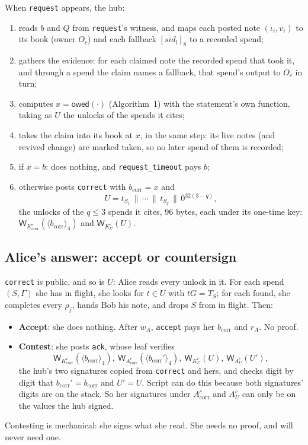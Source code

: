 \documentclass[11pt]{article}
\theoremstyle{plain}
\theoremstyle{definition}
\newcommand{\bcorr}{b_{\mathrm{corr}}}
\newcommand{\tx}[1]{\texttt{#1}}
\newcommand{\be}[2]{\langle #1\rangle_{#2}}
\newcommand{\pre}[2]{[#1]_{#2}}
\newcommand{\Wots}{\mathsf{W}}
\newcommand{\sid}{\mathit{sid}}
\newcommand{\owed}{\mathsf{owed}}
\newcommand{\Oc}{O_c}
\newcommand{\Kcorr}{K_{\mathrm{corr}}^{c}}
\newcommand{\KU}{K_{U}^{c}}
\newcommand{\Acorr}{A_{\mathrm{corr}}^{c}}
\newcommand{\AU}{A_{U}^{c}}
\begin{document}
When \tx{request} appears, the hub:
\begin{enumerate}[nosep]
\item reads $b$ and $Q$ from \tx{request}'s witness, and maps each posted
  note $(\iota_i, v_i)$ to its book (owner $\Oc$) and each fallback
  $\pre{\sid_l}{8}$ to a recorded spend;
\item gathers the evidence: for each claimed note the recorded spend that
  took it, and through a spend the claim names a fallback, that spend's
  output to $\Oc$ in turn;
\item computes $x = \owed(\cdot)$ (Algorithm~1) with the statement's own
  function, taking as $U$ the unlocks of the spends it cites;
\item takes the claim into its book at $x$, in the same step: its live
  notes (and revived change) are marked taken, so no later spend of them
  is recorded;
\item if $x = b$: does nothing, and \tx{request\_timeout} pays $b$;
\item otherwise posts \tx{correct} with $\bcorr = x$ and
  \[
    U = t_{S_1} \,\|\, \cdots \,\|\, t_{S_q} \,\|\, 0^{32(3 - q)},
  \]
  the unlocks of the $q \le 3$ spends it cites, 96 bytes, each under its
  one-time key: $\Wots_{\Kcorr}(\be{\bcorr}{4})$ and $\Wots_{\KU}(U)$.
\end{enumerate}

\subsection{Alice's answer: accept or countersign}\label{sec:ack}

\tx{correct} is public, and so is $U$: Alice reads every unlock in it.
For each spend $(S, \Gamma)$ she has in flight, she looks for $t \in U$
with $tG = T_S$; for each found, she completes every $\rho_j$, hands
Bob his note, and drops $S$ from in flight. Then:
\begin{itemize}[nosep]
\item \textbf{Accept}: she does nothing. After $w_A$, \tx{accept} pays
  her $\bcorr$ and $r_A$. No proof.
\item \textbf{Contest}: she posts \tx{ack}, whose leaf verifies
  \[
    \Wots_{\Kcorr}(\be{\bcorr}{4}),\ \Wots_{\Acorr}(\be{\bcorr'}{4}),\
    \Wots_{\KU}(U),\ \Wots_{\AU}(U'),
  \]
  the hub's two signatures copied from \tx{correct} and hers, and checks
  digit by digit that $\bcorr' = \bcorr$ and $U' = U$. Script can do
  this because both signatures' digits are on the stack. So her
  signatures under $\Acorr$ and $\AU$ can only be on the values the hub
  signed.
\end{itemize}
Contesting is mechanical: she signs what she read. She needs no proof,
and will never need one.
\end{document}
